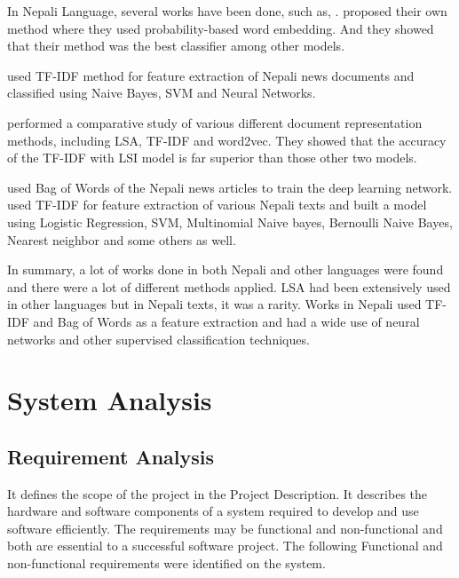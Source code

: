 \documentclass[12pt]{report}
\begin{document}
                        In Nepali Language, several works have been done, such as,
                        \cite{sitaula2021vector,shahi2018nepali,kafle2016improving,subba2019nepali,singh2018nepali}. \cite{sitaula2021vector} proposed their own method where they used probability-based
                        word embedding. And they showed that their method was the best classifier among other models.

                        \cite{shahi2018nepali} used TF-IDF method for feature extraction of Nepali news documents and classified using Naive Bayes, SVM and Neural Networks.

                        \cite{kafle2016improving} performed a comparative study of various different document representation methods, including LSA, TF-IDF and word2vec. They showed that the accuracy
                        of the TF-IDF with LSI model is far superior than those other two models.

                        \cite{subba2019nepali} used Bag of Words\cite{salton1983introduction} of the Nepali news articles to train the deep learning network. \cite{singh2018nepali} used TF-IDF for
                        feature extraction of various Nepali texts and built a model using Logistic Regression, SVM, Multinomial Naive bayes, Bernoulli Naive Bayes, Nearest neighbor and some others as well.

                        In summary, a lot of works done in both Nepali and other languages were found and there were a lot of different methods applied. LSA had been extensively used in
                        other languages but in Nepali texts, it was a rarity. Works in Nepali used TF-IDF and Bag of Words as a feature extraction and had a wide use of neural networks and other
                        supervised classification techniques.



            \chapter{System Analysis}

            \section{Requirement Analysis}
            It defines the scope of the project in the Project Description. It describes the hardware and software components of a system required to develop and use software
            efficiently.
            The requirements may be functional and non-functional and both are essential to a successful software project.
            The following Functional and non-functional requirements were identified on the system.
\end{document}

